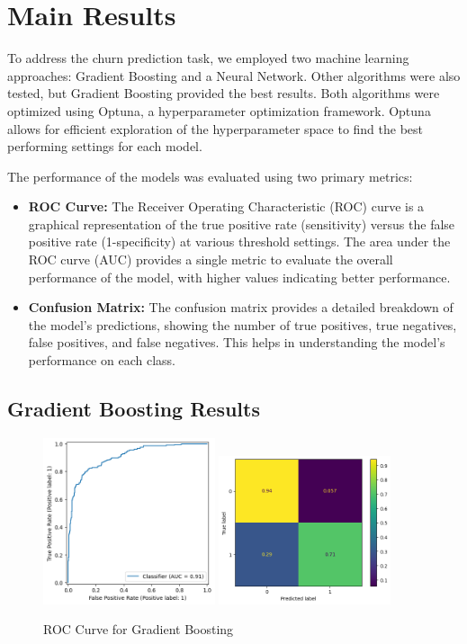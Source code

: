 \documentclass[12pt]{article}
\begin{document}
\section{Main Results}
To address the churn prediction task, we employed two machine learning approaches: Gradient Boosting and a Neural Network. Other algorithms were also tested, but Gradient Boosting provided the best results. Both algorithms were optimized using Optuna, a hyperparameter optimization framework. Optuna allows for efficient exploration of the hyperparameter space to find the best performing settings for each model.

The performance of the models was evaluated using two primary metrics:
\begin{itemize}
    \item \textbf{ROC Curve:} The Receiver Operating Characteristic (ROC) curve is a graphical representation of the true positive rate (sensitivity) versus the false positive rate (1-specificity) at various threshold settings. The area under the ROC curve (AUC) provides a single metric to evaluate the overall performance of the model, with higher values indicating better performance.
    \item \textbf{Confusion Matrix:} The confusion matrix provides a detailed breakdown of the model's predictions, showing the number of true positives, true negatives, false positives, and false negatives. This helps in understanding the model's performance on each class.
\end{itemize}

\subsection{Gradient Boosting Results}

\begin{figure}[h!]
    \centering
    \includegraphics[width=0.45\textwidth]{figures/roc_curve_gb.png}
    \includegraphics[width=0.45\textwidth]{figures/confusion_matrix_gb.png}
    \caption{ROC Curve for Gradient Boosting}
    \label{fig:roc_curve_gb}
\end{figure}
\end{document}
